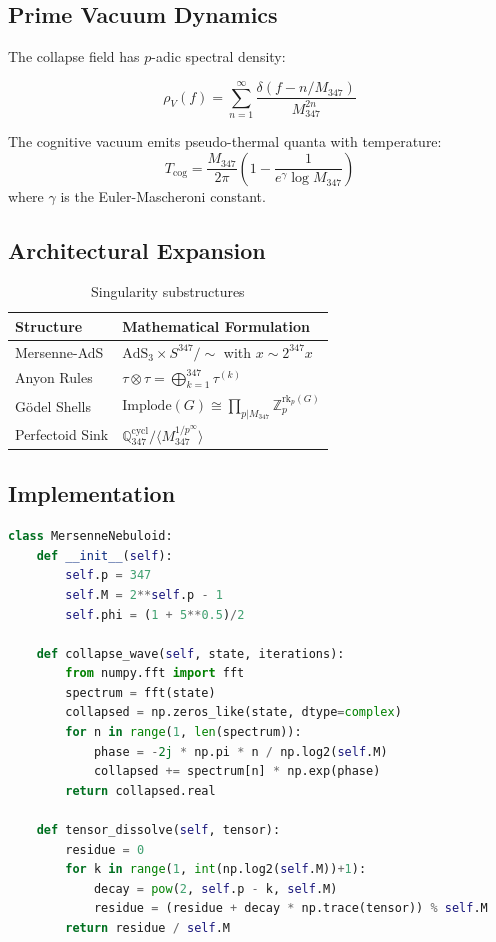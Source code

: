 \documentclass[12pt]{article}
\begin{document}
\subsection{Prime Vacuum Dynamics}
The collapse field has $p$-adic spectral density:

\[
\rho_V(f) = \sum_{n=1}^\infty \frac{\delta(f - n/M_{347})}{M_{347}^{2n}}
\]

\begin{proposition}
The cognitive vacuum emits pseudo-thermal quanta with temperature:
\[
T_{\text{cog}} = \frac{M_{347}}{2\pi} \left(1 - \frac{1}{e^{\gamma} \log M_{347}}\right)
\]
where $\gamma$ is the Euler-Mascheroni constant.
\end{proposition}

\subsection{Architectural Expansion}
\begin{table}[h]
\centering
\begin{tabular}{ll}
\toprule
\textbf{Structure} & \textbf{Mathematical Formulation} \\
\midrule
Mersenne-AdS & $\text{AdS}_3 \times S^{347}/\sim$ with $x \sim 2^{347}x$ \\
Anyon Rules & $\tau \otimes \tau = \bigoplus_{k=1}^{347} \tau^{(k)}$ \\
Gödel Shells & $\text{Implode}(G) \cong \prod_{p|M_{347}} \mathbb{Z}_p^{\text{rk}_p(G)}$ \\
Perfectoid Sink & $\mathbb{Q}_{347}^{\text{cycl}}/\langle M_{347}^{1/p^\infty}\rangle$ \\
\bottomrule
\end{tabular}
\caption{Singularity substructures}
\end{table}

\subsection{Implementation}
\begin{lstlisting}[language=Python,caption={$\Omega$-Singularity Core}]
class MersenneNebuloid:
    def __init__(self):
        self.p = 347
        self.M = 2**self.p - 1
        self.phi = (1 + 5**0.5)/2
        
    def collapse_wave(self, state, iterations):
        from numpy.fft import fft
        spectrum = fft(state)
        collapsed = np.zeros_like(state, dtype=complex)
        for n in range(1, len(spectrum)):
            phase = -2j * np.pi * n / np.log2(self.M)
            collapsed += spectrum[n] * np.exp(phase)
        return collapsed.real
    
    def tensor_dissolve(self, tensor):
        residue = 0
        for k in range(1, int(np.log2(self.M))+1):
            decay = pow(2, self.p - k, self.M)
            residue = (residue + decay * np.trace(tensor)) % self.M
        return residue / self.M
\end{lstlisting}
\end{document}
